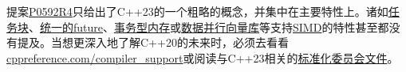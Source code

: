 提案\href{http://www.open-std.org/jtc1/sc22/wg21/docs/papers/2019/p0592r4.html}{P0592R4}只给出了C++23的一个粗略的概念，并集中在主要特性上。诸如\href{ttps://www.modernescpp.com/index.php/task-blocks}{任务块}、\href{https://www.modernescpp.com/index.php/the-end-of-the-detour-unified-futures}{统一的future}、\href{https://www.modernescpp.com/index.php/transactional-memory}{事务型内存}或\href{https://en.cppreference.com/w/cpp/experimental/simd}{数据并行向量库}等支持\href{https://en.wikipedia.org/wiki/SIMD}{SIMD}的特性甚至都没有提及。当想更深入地了解C++20的未来时，必须去看看\href{https://en.cppreference.com/w/cpp/compiler_support}{cppreference.com/compiler\_support}或阅读与C++23相关的\href{http://www.open-std.org/jtc1/sc22/wg21/docs/papers/}{标准化委员会文件}。















